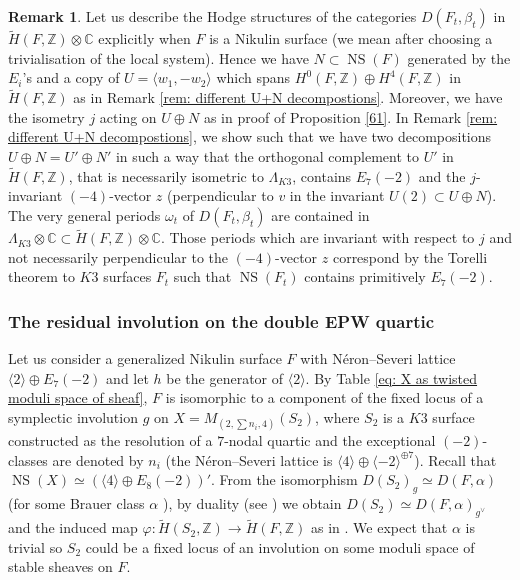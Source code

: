 \documentclass{amsart}
\theoremstyle{definition}
\newtheorem{rem}[thm]{Remark}
\numberwithin{equation}{section}
\numberwithin{equation}{section} \theoremstyle{definition}
\DeclareMathOperator{\NS}{NS}
\newcommand\ZZ{{\mathbb Z}}
\newcommand\Z{\mathbb{Z}}
\begin{document}
\begin{rem}
Let us describe the Hodge structures of the categories $D(F_t,\beta_t)$ in $\tilde{H}(F,\ZZ)\otimes \mathbb C$ explicitly when $F$ is a Nikulin surface (we mean after choosing a trivialisation of the local system). Hence we have $N\subset \NS(F)$ generated by the $E_i$'s and a copy of $U=\langle w_1,-w_2\rangle$ which spans $H^0(F,\Z)\oplus H^4(F,\Z)$ in $\tilde{H}(F,\Z)$ as in Remark \ref{rem: different U+N decompostions}. Moreover, we have the isometry $j$ acting on $U\oplus N$ as in proof of Proposition \ref{61}.
In Remark \ref{rem: different U+N decompostions}, we show 
such that we have two decompositions $U\oplus N=U'\oplus N'$ in such a way that the orthogonal complement to $U'$ in $\tilde{H}(F,\ZZ)$, that is necessarily isometric to $\Lambda_{K3}$, 
contains $E_7(-2)$ %
and the $j$-invariant $(-4)$-vector $z$ (perpendicular to $v$ in the invariant $U(2)\subset U\oplus N$).  The very general periods $\omega_t$ of $D(F_t,\beta_t)$ are contained in
$\Lambda_{K3}\otimes \mathbb C \subset \tilde{H}(F,\ZZ)\otimes \mathbb C $. Those periods which are invariant with respect to $j$ and not necessarily perpendicular to the $(-4)$-vector $z$ correspond by the Torelli theorem  to $K3$ surfaces $F_t$ such that $\NS(F_t)$ contains primitively $E_7(-2)$.
\end{rem}


\subsubsection{The residual involution on the double EPW quartic}\label{14.1}
Let us consider a generalized Nikulin surface $F$
with N\'eron--Severi lattice $\langle2\rangle\oplus E_7(-2)$ and let $h$ be the generator of  $\langle 2\rangle$. 
 By Table \ref{eq: X as twisted moduli space of sheaf},  $F$ is isomorphic to a component of the fixed locus of a symplectic involution $g$ on $X=M_{(2,\sum n_i,4)}(S_2)$, where $S_2$ is a $K3$ surface constructed as the resolution of a $7$-nodal quartic and the exceptional $(-2)$-classes are denoted by $n_i$ (the N\'eron--Severi lattice is $\langle4\rangle\oplus \langle-2\rangle^{\oplus 7}$). {Recall that $\NS(X)\simeq (\langle 4\rangle\oplus E_8(-2))'$.} 
 From the isomorphism $D(S_2)_g\simeq D(F,\alpha)$ (for some Brauer class $\alpha$ \cite{BO}),  by duality (see \cite{El}) we obtain  $D(S_2)\simeq D(F,\alpha)_{g^{\vee}}$ and the induced map $\varphi\colon \tilde{H}(S_2,\ZZ)\to \tilde{H}(F,\ZZ)$ as in \cite[Section 7.3]{BO}. We expect that $\alpha$ is trivial so $S_2$ could be a fixed locus of an involution on some moduli space of stable sheaves on $F$.
\end{document}
